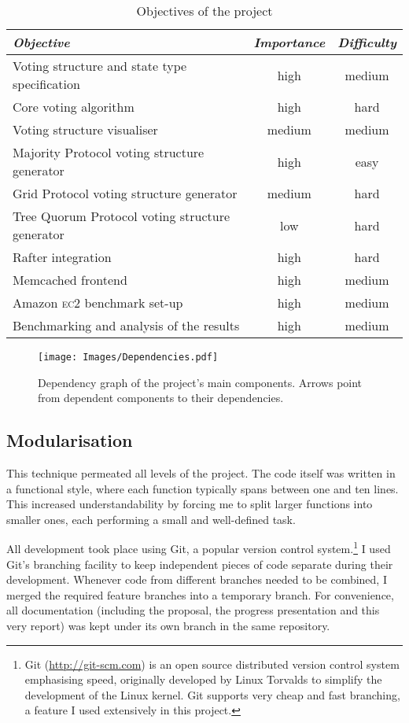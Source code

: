 \documentclass[11pt,chapterprefix=true,toc=bibliography,numbers=noendperiod,
               footnotes=multiple,twoside]{scrreprt}
\newcommand{\ECC}[0]{\textsc{ec}2 }
\begin{document}
\begin{table}[h]
    \centering
    \begin{tabularx}{\textwidth}{X c c}
        \toprule
        \textit{Objective} & \textit{Importance} & \textit{Difficulty} \\
        \midrule
        Voting structure and state type specification & high & medium \\
        Core voting algorithm & high & hard \\
        Voting structure visualiser & medium & medium \\
        Majority Protocol voting structure generator & high & easy \\
        Grid Protocol voting structure generator & medium & hard \\
        Tree Quorum Protocol voting structure generator & low & hard \\
        Rafter integration & high & hard \\
        Memcached frontend & high & medium \\
        Amazon \ECC benchmark set-up & high & medium \\
        Benchmarking and analysis of the results & high & medium \\
        \bottomrule
    \end{tabularx}
    \caption{Objectives of the project}
    \label{tab:objectives}
\end{table}

\begin{figure}[h]
    \centering
    \texttt{[image: Images/Dependencies.pdf]}
    \caption{Dependency graph of the project's main components. Arrows point from dependent components to their dependencies.}
    \label{fig:dependencies}
\end{figure}

\subsection{Modularisation}

This technique permeated all levels of the project. The code itself was written in a functional style, where each function typically spans between one and ten lines. This increased understandability by forcing me to split larger functions into smaller ones, each performing a small and well-defined task.

All development took place using Git, a popular version control system.\footnote{Git (\url{http://git-scm.com}) is an open source distributed version control system emphasising speed, originally developed by Linux Torvalds to simplify the development of the Linux kernel. Git supports very cheap and fast branching, a feature I used extensively in this project.} I used Git's branching facility to keep independent pieces of code separate during their development. Whenever code from different branches needed to be combined, I merged the required feature branches into a temporary branch. For convenience, all documentation (including the proposal, the progress presentation and this very report) was kept under its own branch in the same repository.
\end{document}
